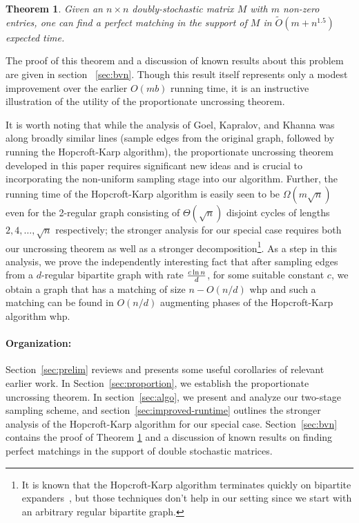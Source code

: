 \documentclass[11pt]{article}
\newtheorem{theorem}{Theorem}[section]
\begin{document}
\begin{theorem} \label{thm:bvn}
  Given an $n \times n$ doubly-stochastic matrix $M$ with $m$ non-zero
  entries, one can find a perfect matching in the support of $M$ in
  $\tilde{O}( m + n^{1.5})$ expected time.
\end{theorem}

The proof of this theorem and a discussion of known results about this problem are given in section ~\ref{sec:bvn}. Though this
result itself represents only a modest improvement over the earlier $O(mb)$
running time, it is an instructive illustration of the utility of the
proportionate uncrossing theorem.

It is worth noting that while the analysis of Goel, Kapralov, and Khanna was
along broadly similar lines (sample edges from the original graph, followed by
running the Hopcroft-Karp algorithm), the proportionate uncrossing theorem
developed in this paper requires significant new ideas and is crucial to
incorporating the non-uniform sampling stage into our algorithm. Further, the
running time of the Hopcroft-Karp algorithm is easily seen to be
$\Omega(m\sqrt{n})$ even for the 2-regular graph consisting of
$\Theta(\sqrt{n})$ disjoint cycles of lengths $2, 4, \ldots, \sqrt{n}$
respectively; the stronger analysis for our special case requires both our
uncrossing theorem as well as a stronger decomposition\footnote{It is known
  that the Hopcroft-Karp algorithm terminates quickly on bipartite
  expanders~\cite{motwani}, but those techniques don't help in our setting
  since we start with an arbitrary regular bipartite graph.}. As a step in
this analysis, we prove the independently interesting fact that after sampling
edges from a $d$-regular bipartite graph with rate $c \ln n\over d$, for some
suitable constant $c$, we obtain a graph that has a matching of size
$n-O(n/d)$ whp and such a matching can be found in $O(n/d)$ augmenting phases
of the Hopcroft-Karp algorithm whp.

\noindent
\paragraph{Organization:}
Section~\ref{sec:prelim} reviews and presents some useful corollaries of
relevant earlier work. In Section~\ref{sec:proportion}, we establish the
proportionate uncrossing theorem. In section~\ref{sec:algo}, we
present and analyze our two-stage sampling scheme, and
section~\ref{sec:improved-runtime} outlines the stronger analysis of the
Hopcroft-Karp algorithm for our special case. Section~\ref{sec:bvn} contains the proof of Theorem \ref{thm:bvn}
and a discussion of known results on finding perfect matchings in the support of double stochastic matrices.
\end{document}
